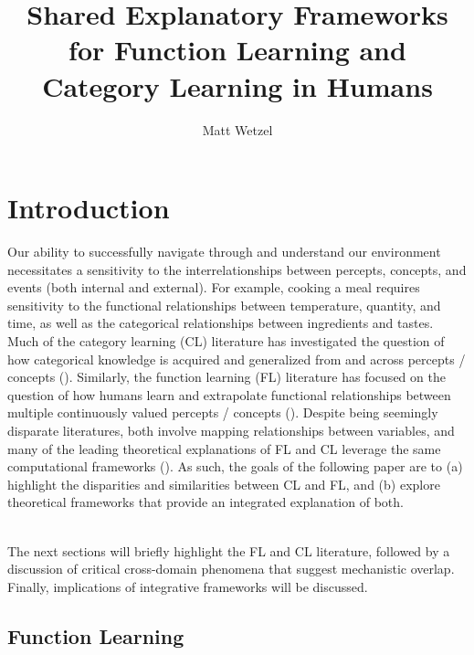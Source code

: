 \documentclass[12pt]{article}
\title{Shared Explanatory Frameworks for Function Learning and Category Learning in Humans}
\author{Matt Wetzel}
\let\oldcite=\cite
\renewcommand{\cite}[1]{\textcolor[rgb]{0, .121, .388}{\oldcite{#1}}}
\begin{document}
%
%
\maketitle
\pagebreak

\tableofcontents
\pagebreak




%
%

\section{Introduction}

Our ability to successfully navigate through and understand our environment necessitates a sensitivity to the interrelationships between percepts, concepts, and events (both internal and external). For example, cooking a meal requires sensitivity to the functional relationships between temperature, quantity, and time, as well as the categorical relationships between ingredients and tastes. Much of the category learning (CL) literature has investigated the question of how categorical knowledge is acquired and generalized from and across percepts / concepts (\cite{kurtz2015human,ashby2005human}). Similarly, the function learning (FL) literature has focused on the question of how humans learn and extrapolate functional relationships between multiple continuously valued percepts / concepts (\cite{kalish2004population,busemeyer1997learning}). Despite being seemingly disparate literatures, both involve mapping relationships between variables, and many of the leading theoretical explanations of FL and CL leverage the same computational frameworks (\cite{busemeyer1997learning,lucas2015rational}). As such, the goals of the following paper are to (a) highlight the disparities and similarities between CL and FL, and (b) explore theoretical frameworks that provide an integrated explanation of both. 

\mbox{}\\
The next sections will briefly highlight the FL and CL literature, followed by a discussion of critical cross-domain phenomena that suggest mechanistic overlap. Finally, implications of integrative frameworks will be discussed.

\subsection{Function Learning}
\end{document}

